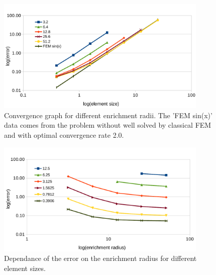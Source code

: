 \documentclass[preprint,12pt]{elsarticle}
\newcommand{\figpath}{../graphics/}
\begin{document}
\begin{figure}[!htb]
  \centering    
  \includegraphics[width=0.9\textwidth]{results/radius_conv_1.pdf}
  \caption[Enrichment radius choice.]{Convergence graph for different enrichment radii. The 'FEM sin(x)'
  data comes from the problem without well solved by classical FEM and with optimal convergence rate 2.0.}
  \label{fig:radius_conv_1}
\end{figure}
\begin{figure}[!htb]
  \centering    
  \includegraphics[width=0.9\textwidth]{results/radius_conv_2.pdf}
  \caption[Enrichment radius choice.]{Dependance of the error on the enrichment radius for different
  element sizes.}
  \label{fig:radius_conv_2}
\end{figure}
\end{document}
